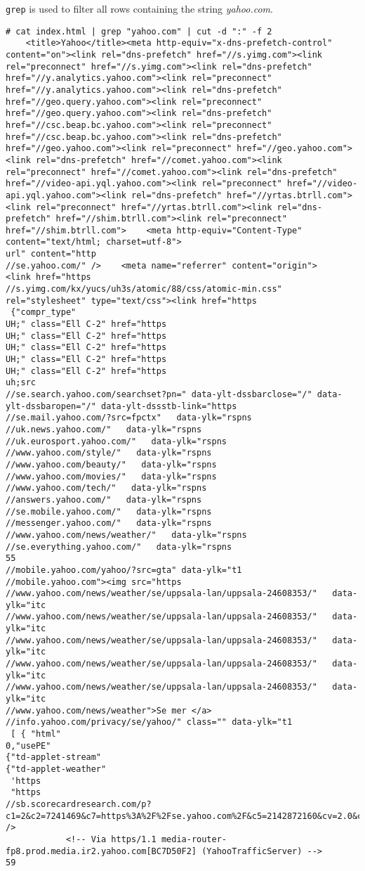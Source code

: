 \texttt{grep} is used to filter all rows containing the string \textit{yahoo.com}.

\begin{lstlisting}[numbers=none, language={}, frame=single, framexleftmargin={0.2em}]
# cat index.html | grep "yahoo.com" | cut -d ":" -f 2
    <title>Yahoo</title><meta http-equiv="x-dns-prefetch-control" content="on"><link rel="dns-prefetch" href="//s.yimg.com"><link rel="preconnect" href="//s.yimg.com"><link rel="dns-prefetch" href="//y.analytics.yahoo.com"><link rel="preconnect" href="//y.analytics.yahoo.com"><link rel="dns-prefetch" href="//geo.query.yahoo.com"><link rel="preconnect" href="//geo.query.yahoo.com"><link rel="dns-prefetch" href="//csc.beap.bc.yahoo.com"><link rel="preconnect" href="//csc.beap.bc.yahoo.com"><link rel="dns-prefetch" href="//geo.yahoo.com"><link rel="preconnect" href="//geo.yahoo.com"><link rel="dns-prefetch" href="//comet.yahoo.com"><link rel="preconnect" href="//comet.yahoo.com"><link rel="dns-prefetch" href="//video-api.yql.yahoo.com"><link rel="preconnect" href="//video-api.yql.yahoo.com"><link rel="dns-prefetch" href="//yrtas.btrll.com"><link rel="preconnect" href="//yrtas.btrll.com"><link rel="dns-prefetch" href="//shim.btrll.com"><link rel="preconnect" href="//shim.btrll.com">    <meta http-equiv="Content-Type" content="text/html; charset=utf-8">
url" content="http
//se.yahoo.com/" />    <meta name="referrer" content="origin">        <link href="https
//s.yimg.com/kx/yucs/uh3s/atomic/88/css/atomic-min.css" rel="stylesheet" type="text/css"><link href="https
 {"compr_type"
UH;" class="Ell C-2" href="https
UH;" class="Ell C-2" href="https
UH;" class="Ell C-2" href="https
UH;" class="Ell C-2" href="https
UH;" class="Ell C-2" href="https
uh;src
//se.search.yahoo.com/searchset?pn=" data-ylt-dssbarclose="/" data-ylt-dssbaropen="/" data-ylt-dssstb-link="https
//se.mail.yahoo.com/?src=fpctx"   data-ylk="rspns
//uk.news.yahoo.com/"   data-ylk="rspns
//uk.eurosport.yahoo.com/"   data-ylk="rspns
//www.yahoo.com/style/"   data-ylk="rspns
//www.yahoo.com/beauty/"   data-ylk="rspns
//www.yahoo.com/movies/"   data-ylk="rspns
//www.yahoo.com/tech/"   data-ylk="rspns
//answers.yahoo.com/"   data-ylk="rspns
//se.mobile.yahoo.com/"   data-ylk="rspns
//messenger.yahoo.com/"   data-ylk="rspns
//www.yahoo.com/news/weather/"   data-ylk="rspns
//se.everything.yahoo.com/"   data-ylk="rspns
55
//mobile.yahoo.com/yahoo/?src=gta" data-ylk="t1
//mobile.yahoo.com"><img src="https
//www.yahoo.com/news/weather/se/uppsala-lan/uppsala-24608353/"   data-ylk="itc
//www.yahoo.com/news/weather/se/uppsala-lan/uppsala-24608353/"   data-ylk="itc
//www.yahoo.com/news/weather/se/uppsala-lan/uppsala-24608353/"   data-ylk="itc
//www.yahoo.com/news/weather/se/uppsala-lan/uppsala-24608353/"   data-ylk="itc
//www.yahoo.com/news/weather/se/uppsala-lan/uppsala-24608353/"   data-ylk="itc
//www.yahoo.com/news/weather">Se mer </a>
//info.yahoo.com/privacy/se/yahoo/" class="" data-ylk="t1
 [ { "html"
0,"usePE"
{"td-applet-stream"
{"td-applet-weather"
 'https
 "https
//sb.scorecardresearch.com/p?c1=2&c2=7241469&c7=https%3A%2F%2Fse.yahoo.com%2F&c5=2142872160&cv=2.0&cj=1" />
            <!-- Via https/1.1 media-router-fp8.prod.media.ir2.yahoo.com[BC7D50F2] (YahooTrafficServer) -->
59
\end{lstlisting}

